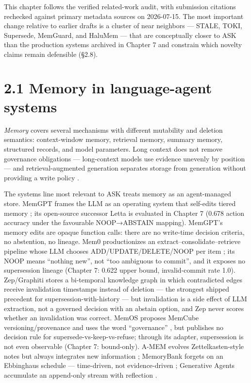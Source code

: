 This chapter follows the verified related-work audit, with submission
citations rechecked against primary metadata sources on 2026-07-15. The
most important change relative to earlier drafts is a cluster of near
neighbors --- STALE, TOKI, Supersede, MemGuard, and HaluMem --- that are
conceptually closer to ASK than the production systems archived in
Chapter 7 and constrain which novelty claims remain defensible (§2.8).

\section{2.1 Memory in language-agent
systems}\label{memory-in-language-agent-systems}

\emph{Memory} covers several mechanisms with different mutability and
deletion semantics: context-window memory, retrieval memory, summary
memory, structured records, and model parameters. Long context does not
remove governance obligations --- long-context models use evidence
unevenly by position \citep{liu2024lost} --- and retrieval-augmented
generation separates storage from generation without providing a write
policy \citep{lewis2020retrieval, borgeaud2022improving}.

The systems line most relevant to ASK treats memory as an agent-managed
store. MemGPT frames the LLM as an operating system that self-edits
tiered memory \citep{packer2023memgpt}; its open-source successor Letta
is evaluated in Chapter 7 (0.678 action accuracy under the favourable
NOOP→ABSTAIN mapping). MemGPT's memory edits are opaque function calls:
there are no write-time decision criteria, no abstention, no lineage.
Mem0 productionizes an extract--consolidate--retrieve pipeline whose LLM
chooses ADD/UPDATE/DELETE/NOOP per item \citep{chhikara2025mem0}; its
NOOP means ``nothing new'', not ``too ambiguous to commit'', and it
exposes no supersession lineage (Chapter 7: 0.622 upper bound,
invalid-commit rate 1.0). Zep/Graphiti stores a bi-temporal knowledge
graph in which contradicted edges receive invalidation timestamps
instead of deletion \citep{rasmussen2025zep} --- the strongest shipped
precedent for supersession-with-history --- but invalidation is a side
effect of LLM extraction, not a governed decision with an abstain
option, and Zep never scores whether an invalidation was correct. MemOS
proposes MemCube versioning/provenance and uses the word ``governance''
\citep{li2025memos}, but publishes no decision rule for
supersede-vs-keep-vs-refuse; through its adapter, supersession is not
even observable (Chapter 7: bound-only). A-MEM evolves
Zettelkasten-style notes but always integrates new information
\citep{xu2025amem}; MemoryBank forgets on an Ebbinghaus schedule ---
time-driven, not evidence-driven \citep{zhong2024memorybank}; Generative
Agents accumulate an append-only stream with reflection
\citep{park2023generative}.

